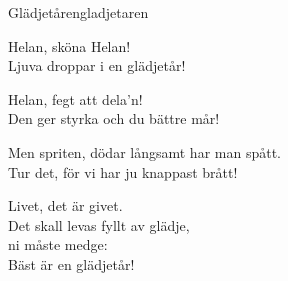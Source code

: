 \begin{song}{Glädjetåren}{gladjetaren}
\begin{vers}
Helan, sköna Helan!\\
Ljuva droppar i en glädjetår!\\
\end{vers}
\begin{vers}
Helan, fegt att dela'n!\\
Den ger styrka och du bättre mår!\\
\end{vers}
\begin{vers}
Men spriten, dödar långsamt har man spått.\\
Tur det, för vi har ju knappast brått!\\
\end{vers}
\begin{vers}
Livet, det är givet.\\
Det skall levas fyllt av glädje, \\
ni måste medge:\\
Bäst är en glädjetår!\\
\end{vers}
\end{song}
